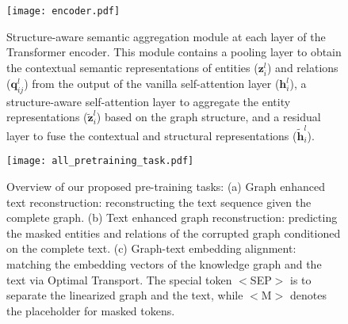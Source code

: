\documentclass[11pt,a4paper]{article}
\begin{document}
\begin{figure}[!htp]
  \centering
  \texttt{[image: encoder.pdf]}\caption{Structure-aware semantic aggregation module at each layer of the Transformer encoder. This module contains a pooling layer to obtain the contextual semantic representations of entities ($\bm{z}_i^l$) and relations ($\bm{q}_{ij}^l$) from the output of the vanilla self-attention layer ($\bm{h}_i^l$), a structure-aware self-attention layer to aggregate the entity representations ($\tilde{\bm{z}}_i^l$) based on the graph structure, and a residual layer to fuse the contextual and structural representations ($\tilde{\bm{h}}_i^l$).}
  \label{fig:encoder}
\end{figure}

\begin{figure*}[!htp]
  \centering
  \texttt{[image: all\_pretraining\_task.pdf]}\caption{Overview of our proposed pre-training tasks: (a) Graph enhanced text reconstruction: reconstructing the text sequence given the complete graph. (b) Text enhanced graph reconstruction: predicting the masked entities and relations of the corrupted graph conditioned on the complete text. (c) Graph-text embedding alignment: matching the embedding vectors of the knowledge graph and the text via Optimal Transport. The special token $<$SEP$>$ is to separate the linearized graph and the text, while $<$M$>$ denotes the placeholder for masked tokens.}
  \label{fig:overview}
\end{figure*}
\end{document}
